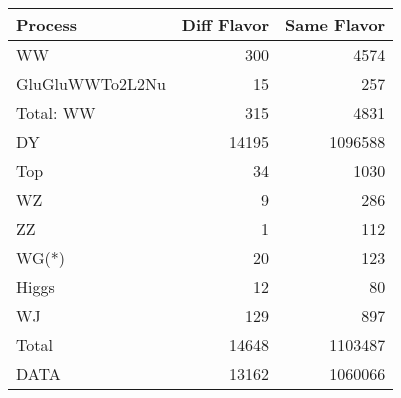 \begin{table}[ht]
	\centering
\begin{tabular}{lrr}

         Process &  Diff Flavor &  Same Flavor \\
		\hline
              WW &          300 &         4574 \\
 GluGluWWTo2L2Nu &           15 &          257 \\
\hline
       Total: WW &          315 &         4831 \\
              DY &        14195 &      1096588 \\
             Top &           34 &         1030 \\
              WZ &            9 &          286 \\
              ZZ &            1 &          112 \\
           WG(*) &           20 &          123 \\
           Higgs &           12 &           80 \\
              WJ &          129 &          897 \\
\hline
           Total &        14648 &      1103487 \\
            DATA &        13162 &      1060066 \\


\end{tabular}

\end{table}